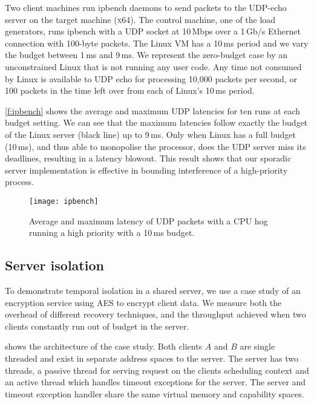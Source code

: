 Two client machines run ipbench daemons to send packets to the UDP-echo server on the target machine
(\textsc{x64}). The control machine, one of the load generators, runs ipbench with a \gls{UDP} socket at 10\,Mbps over a 1\,Gb/s Ethernet connection with 100-byte packets. The Linux VM has a 10\,ms period and we vary the
budget between 1\,ms and 9\,ms.
We represent the zero-budget case by an unconstrained Linux that is not running any user code.
Any time not consumed by Linux is available to UDP echo for processing
10,000 packets per second, or 100 packets in the time left over from
each of Linux's 10\,ms period.

\autoref{f:ipbench} shows the average and maximum \gls{UDP} latencies for
ten runs at each budget setting. We can see that the maximum latencies
follow exactly the budget of the Linux server (black line) up to 9\,ms. Only
when Linux has a full budget (10\,ms), and thus able to monopolise the
processor, does the UDP server miss its deadlines, resulting in a
latency blowout.  This result shows that our sporadic server implementation is effective in bounding interference of a high-priority process.

\begin{figure}[h]
  \centering
  \texttt{[image: ipbench]}
  \caption{Average and maximum latency of UDP packets with a CPU hog running a high priority with a 10\,ms budget.}
  \label{f:ipbench}
\end{figure}

\subsection{Server isolation} 
\label{s:server-isolation}

To demonstrate temporal isolation in a shared server, we use a case study of an encryption service
using \gls{AES} to encrypt client data. We measure both the overhead of different recovery techniques, and the
throughput achieved when two clients constantly run out of budget in the server.

 shows the architecture of the case study. Both clients $A$ and $B$ are single
 threaded and exist in separate address spaces to the server. The server has two threads, a passive
 thread for serving request on the clients scheduling context and an active thread which handles
 timeout exceptions for the server. The server and timeout exception handler share the same virtual
 memory and capability spaces.

